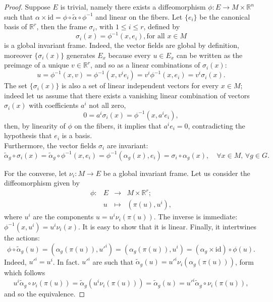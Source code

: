 \documentclass[10pt,a4paper]{amsart}
\newcommand{\R}{\mathbb{R}}
\begin{document}
\begin{proof}
    Suppose $E$ is trivial, namely there exists a diffeomorphism $\phi:E\to M\times \R^n$ such that $\alpha\times\mathrm{id}=\phi\circ \tilde\alpha\circ \phi^{-1}$ and linear on the fibers. Let $\{e_i\}$ be the canonical basis of $\R^r$, then the frame $\sigma_i$, with $1\leq i\leq r$, defined by 
    \begin{equation*}
        \sigma_i(x)=\phi^{-1}(x,e_i), \text{for all } x \in M
    \end{equation*}
    is a global invariant frame. Indeed, the vector fields are global by definition, moreover $\{\sigma_i(x)\}$ generates $E_x$ because every $u\in E_x$ can be written as the preimage of a unique $v\in \R^r$, and so as a linear combinations of $\sigma_i(x)$:
    \begin{equation}
        u=\phi^{-1}(x,v)=\phi^{-1}(x,v^ie_i)=v^i\phi^{-1}(x,e_i)=v^i\sigma_i(x).
    \end{equation}
    The set $\{\sigma_i(x)\}$ is also a set of linear independent vectors for every $x\in M$; indeed let us assume that there exists a vanishing linear combination of vectors $\sigma_i(x)$ with coefficients $a^i$ not all zero,
    \begin{equation}
        0=a^i\sigma_i(x)=\phi^{-1}(x,a^ie_i),
    \end{equation}
    then, by linearity of $\phi$ on the fibers, it implies that $a^ie_i=0$, contradicting the hypothesis that $e_i$ is a basis.\\
    Furthermore, the vector fields $\sigma_i$ are invariant:
\begin{equation*}
    \tilde \alpha_g \circ\sigma_i(x)=\tilde\alpha_g\circ \phi^{-1}(x,e_i)=\phi^{-1}(\alpha_g(x),e_i)=\sigma_i\circ \alpha_g(x), \quad \forall x\in M,\,\forall g \in G.
\end{equation*}

For the converse, let $\nu_i:M\to E$ be a global invariant frame. Let us consider the diffeomorphism given by
\begin{equation*}
\begin{matrix}
    \phi:&E&\to &M\times \R^r;\\
    &u&\mapsto & (\pi(u),u^i),
\end{matrix}
\end{equation*}
where $u^i$ are the components $u=u^i\nu_i(\pi(u))$. The inverse is immediate: $\phi^{-1}(x,u^i)=u^i\nu_i(x)$. It is easy to show that it is linear. Finally, it intertwines the actions:
\begin{equation*}
    \phi\circ \tilde \alpha_g(u)=(\alpha_g(\pi(u)),u'^i)=(\alpha_g(\pi(u)),u^i)=(\alpha_g\times\mathrm{id})\circ \phi(u).
\end{equation*}
Indeed, $u'^i=u^i$. In fact. $u'^i$ are such that $\tilde\alpha_g(u)=u'^i\nu_i(\alpha_g(\pi(u)))$, form which follows
\begin{equation*}
    u^i\tilde\alpha_g\circ \nu_i(\pi(u))=\tilde\alpha_g(u^i\nu_i(\pi(u)))= \tilde\alpha_g(u)=u'^i\tilde\alpha_g\circ \nu_i(\pi(u)),
\end{equation*}
and so the equivalence.
\end{proof}
\end{document}
